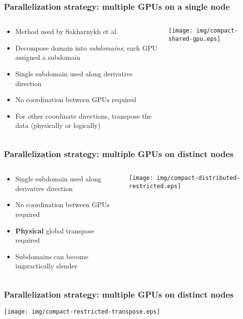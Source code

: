 \begin{frame}
\frametitle{Parallelization strategy: multiple GPUs on a single node}
\begin{columns}
\begin{column}{0.5\textwidth}
\begin{itemize}
\item Method used by Sakharnykh et al.
\item Decompose domain into \emph{subdomains};
    each GPU assigned a subdomain
\item Single subdomain used along derivative direction
\item No coordination between GPUs required
\item For other coordinate directions,
    transpose the data (physically or logically)
\end{itemize}
\end{column}
\begin{column}{0.5\textwidth}
\texttt{[image: img/compact-shared-gpu.eps]}
\end{column}
\end{columns}
\end{frame}

\begin{frame}
\frametitle{Parallelization strategy: multiple GPUs on distinct nodes}
\begin{columns}
\begin{column}{0.5\textwidth}
\begin{itemize}
\item Single subdomain used along derivative direction
\item No coordination between GPUs required
\item \textbf{Physical} global transpose required
\item Subdomains can become impractically slender
\end{itemize}
\end{column}
\begin{column}{0.5\textwidth}
\texttt{[image: img/compact-distributed-restricted.eps]}
\end{column}
\end{columns}
\end{frame}

\begin{frame}
\frametitle{Parallelization strategy: multiple GPUs on distinct nodes}
\centering
\texttt{[image: img/compact-restricted-transpose.eps]}
\end{frame}

